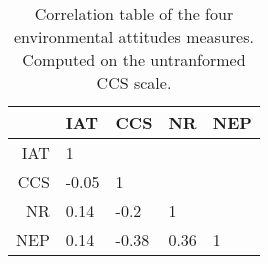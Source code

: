 \begin{table}[ht]
\centering
\begin{tabular}{rllll}
  \hline
 & IAT & CCS & NR & NEP \\ 
  \hline
IAT & 1 &  &  &  \\ 
  CCS & -0.05 & 1 &  &  \\ 
  NR & 0.14 & -0.2 & 1 &  \\ 
  NEP & 0.14 & -0.38 & 0.36 & 1 \\ 
   \hline
\end{tabular}
\caption{Correlation table of the four environmental attitudes measures. Computed on the untranformed CCS scale.} 
\label{tab:cortable}
\end{table}
